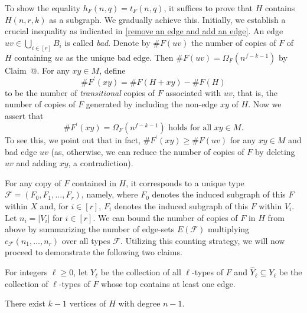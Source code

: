 \documentclass[10pt]{article}
\makeatletter
\newcommand*{\rom}[1]{\expandafter\@slowromancap\romannumeral #1@}
\makeatother
\begin{document}
To show the equality $h_F(n,q)=t_F(n,q)$, it suffices to prove that $H$ contains $H(n,r,k)$ as a subgraph.
We gradually achieve this.
Initially, we establish a crucial inequality as indicated in \eqref{remove an edge and add an edge}.
An edge $uv\in \bigcup_{i\in [r]} B_i$ is called {\it bad}.
Denote by $\#F(uv)$ the number of copies of $F$ of $H$ containing $uv$ as the unique bad edge.
Then $\#F(uv)=\Omega_F(n^{f-k-1})$ by Claim~\rom{3}.
For any $xy\in M$, define
$$\# F^\prime(xy)=\#F(H+xy)- \#F(H)$$
to be the number of {\it transitional} copies of $F$ associated with $uv$, that is, the number of copies of $F$ generated by including the non-edge $xy$ of $H$.
Now we assert that
\begin{equation}\label{remove an edge and add an edge}
\# F^\prime (xy)=\Omega_F(n^{f-k-1}) \mbox{ holds for all $xy\in M$}.
 \end{equation}
To see this, we point out that in fact, $\# F^\prime (xy)\geq \# F(uv)$ for any $xy\in M$ and bad edge $uv$
(as, otherwise, we can reduce the number of copies of $F$ by deleting $uv$ and adding $xy$, a contradiction).


For any copy of $F$ contained in $H$, it corresponds to a unique type $\mathcal{F}=(F_0,F_1,...,F_r)$, namely,
where $F_0$ denotes the induced subgraph of this $F$ within $X$ and, for $i\in [r]$, $F_i$ denotes the induced subgraph of this $F$ within $V_i$.
Let $n_i=|V_i|$ for $i\in [r]$.
We can bound the number of copies of $F$ in $H$ from above by summarizing the number of edge-sets $E(\mathcal{F})$ multiplying $c_{\mathcal{F}}(n_1,\ldots,n_r)$ over all types $\mathcal{F}$.
Utilizing this counting strategy, we will now proceed to demonstrate the following two claims.

For integers $\ell\geq 0$, let $Y_\ell$ be the collection of all $\ell$-types of $F$ and $\widehat{Y}_\ell \subseteq Y_\ell$ be the collection of $\ell$-types of $F$ whose top contains at least one edge.

\medskip

\noindent{\bf Claim \rom{4}.} There exist $k-1$ vertices of $H$ with degree $n-1$.
\end{document}
